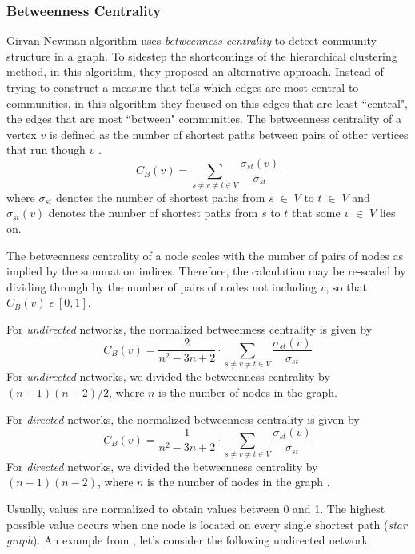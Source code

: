 {\subsubsection*{Betweenness Centrality}\label{betweennesscentrality}
Girvan-Newman algorithm uses \textit{betweenness centrality} to detect community structure in a graph. To sidestep the shortcomings of the hierarchical clustering method, in this algorithm, they proposed an alternative approach. Instead of trying to construct a measure that tells which edges are most central to communities, in this algorithm they focused on this edges that are least ``central", the edges that are most ``between" communities. The betweenness centrality of a vertex $v$ is defined as the number of shortest paths between pairs of other vertices that run though $v$ \cite{ref-11}. 
\begin{equation}
C_B(v) = \sum\limits_{s \neq v \neq t \in V} \dfrac{\sigma_{st}(v)}{\sigma_{st}}
\end{equation}
where $\sigma_{st}$ denotes the number of shortest paths from $s \; \in \; V$ to $t \; \in \; V$ and $\sigma_{st}(v)$ denotes the number of shortest paths from $s$ to $t$ that some $v \; \in \; V$ lies on. 

The betweenness centrality of a node scales with the number of pairs of nodes as implied by the summation indices. Therefore, the calculation may be re-scaled by dividing through by the number of pairs of nodes not including $v$, so that $C_B(v) \; \epsilon \; [0,1]$.

For \textit{undirected} networks, the normalized betweenness centrality is given by
\begin{equation}
C_B(v) = \dfrac{2}{n^2 - 3n + 2} \cdot \sum\limits_{s \neq v \neq t \in V} \dfrac{\sigma_{st}(v)}{\sigma_{st}}
\end{equation}
For \textit{undirected} networks, we divided the betweenness centrality by $(n - 1)(n - 2) / 2$, where $n$ is the number of nodes in the graph.

For \textit{directed} networks, the normalized betweenness centrality is given by
\begin{equation}
C_B(v) = \dfrac{1}{n^2 - 3n + 2} \cdot \sum\limits_{s \neq v \neq t \in V} \dfrac{\sigma_{st}(v)}{\sigma_{st}}
\end{equation}
For \textit{directed} networks, we divided the betweenness centrality by $(n - 1)(n - 2)$, where $n$ is the number of nodes in the graph \cite{ref-17}.

Usually, values are normalized to obtain values between 0 and 1. The highest possible value occurs when one node is located on every single shortest path (\textit{star graph}). An example from \cite{ref-17}, let's consider the following undirected network:

}
